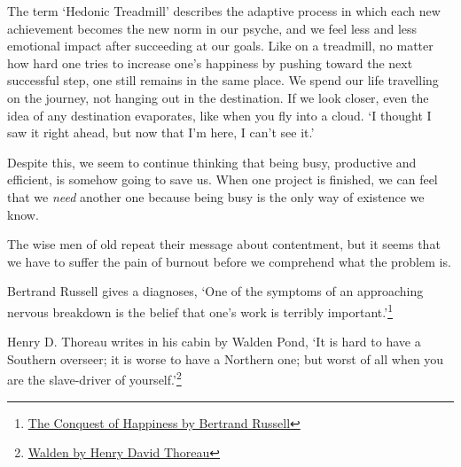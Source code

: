 \clearpage

\vspace*{-\baselineskip}


The term `Hedonic Treadmill' describes the adaptive process in which
each new achievement becomes the new norm in our psyche, and we feel
less and less emotional impact after succeeding at our goals. Like on a
treadmill, no matter how hard one tries to increase one's happiness by
pushing toward the next successful step, one still remains in the same
place. We spend our life travelling on the journey, not hanging out in
the destination. If we look closer, even the idea of any destination
evaporates, like when you fly into a cloud. `I thought I saw it right
ahead, but now that I'm here, I can't see it.'

Despite this, we seem to continue thinking that being busy, productive
and efficient, is somehow going to save us. When one project is
finished, we can feel that we \emph{need} another one because being busy
is the only way of existence we know.

The wise men of old repeat their message about contentment, but it seems
that we have to suffer the pain of burnout before we comprehend what the
problem is.

Bertrand Russell gives a diagnoses, `One of the symptoms of an
approaching nervous breakdown is the belief that one's work is terribly
important.'\footnote{\href{https://www.goodreads.com/book/show/51783.The_Conquest_of_Happiness}{The
    Conquest of Happiness by Bertrand Russell}}

Henry D. Thoreau writes in
his cabin by Walden Pond, `It is hard to have a Southern overseer; it is
worse to have a Northern one; but worst of all when you are the
slave-driver of yourself.'\footnote{\href{https://www.goodreads.com/book/show/16902.Walden}{Walden
  by Henry David Thoreau}}

\clearpage
\figurepagelayout

